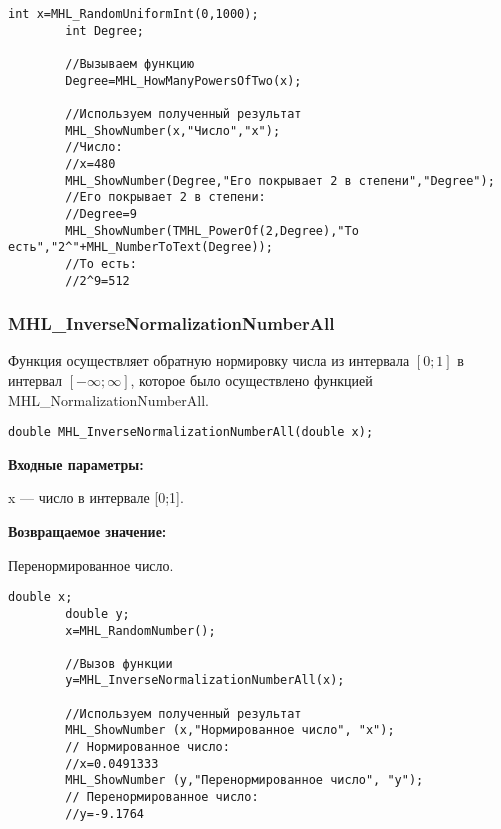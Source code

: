 \documentclass[a4paper,12pt]{article}
\begin{document}
\begin{lstlisting}[label=code_use_MHL_HowManyPowersOfTwo,caption=Пример использования]
        int x=MHL_RandomUniformInt(0,1000);
        int Degree;

        //Вызываем функцию
        Degree=MHL_HowManyPowersOfTwo(x);

        //Используем полученный результат
        MHL_ShowNumber(x,"Число","x");
        //Число:
        //x=480
        MHL_ShowNumber(Degree,"Его покрывает 2 в степени","Degree");
        //Его покрывает 2 в степени:
        //Degree=9
        MHL_ShowNumber(TMHL_PowerOf(2,Degree),"То есть","2^"+MHL_NumberToText(Degree));
        //То есть:
        //2^9=512
\end{lstlisting}

\subsubsection{MHL\_InverseNormalizationNumberAll}\label{MHL_InverseNormalizationNumberAll}

Функция осуществляет обратную нормировку числа из интервала $\left[0;1\right] $  в интервал $\left[-\infty;\infty \right] $, которое было осуществлено функцией MHL\_NormalizationNumberAll.


\begin{lstlisting}[label=code_syntax_MHL_InverseNormalizationNumberAll,caption=Синтаксис]
double MHL_InverseNormalizationNumberAll(double x);
\end{lstlisting}

\textbf{Входные параметры:}

 x --- число в интервале [0;1].

\textbf{Возвращаемое значение:}
 
Перенормированное число.


\begin{lstlisting}[label=code_use_MHL_InverseNormalizationNumberAll,caption=Пример использования]
        double x;
        double y;
        x=MHL_RandomNumber();

        //Вызов функции
        y=MHL_InverseNormalizationNumberAll(x);

        //Используем полученный результат
        MHL_ShowNumber (x,"Нормированное число", "x");
        // Нормированное число:
        //x=0.0491333
        MHL_ShowNumber (y,"Перенормированное число", "y");
        // Перенормированное число:
        //y=-9.1764
\end{lstlisting}
\end{document}
